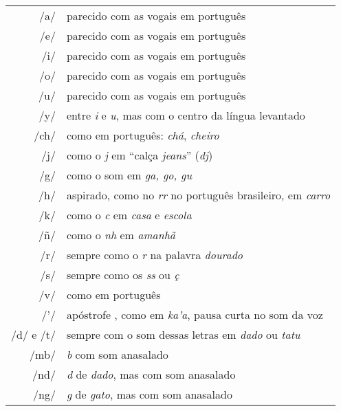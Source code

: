 \begingroup%
\begin{tabular}{rl}
/a/ & parecido com as vogais em português\\
/e/ & parecido com as vogais em português\\
/i/ & parecido com as vogais em português\\
/o/ & parecido com as vogais em português\\
/u/ & parecido com as vogais em português\\
/y/ & entre \textit{i} e \textit{u}, mas com o centro da língua levantado\\
/ch/ & como em português: \textit{chá}, \textit{cheiro}\\
/j/ & como o \textit{j} em ``calça \textit{jeans}'' (\textit{dj})\\
/g/ & como o som em \textit{ga, go, gu }\\
/h/ & aspirado, como no \textit{rr} no português brasileiro, em \textit{carro}\\
/k/ & como o \textit{c} em \textit{casa} e \textit{escola}\\
/ñ/ & como o \textit{nh} em \textit{amanhã}\\
/r/ & sempre como o \textit{r} na palavra \textit{dourado}\\
/s/ & sempre como os \textit{ss} ou \textit{ç}\\
/v/ & como em português\\
/'/ & apóstrofe , como em \textit{ka'a}, pausa curta no som da voz\\
/d/ e /t/ & sempre com o som dessas letras em \textit{dado} ou \textit{tatu}\\
/mb/ & \textit{b} com som anasalado\\
/nd/ & \textit{d} de \textit{dado}, mas com som anasalado\\
/ng/ & \textit{g} de \textit{gato}, mas com som anasalado
\end{tabular}
\endgroup
